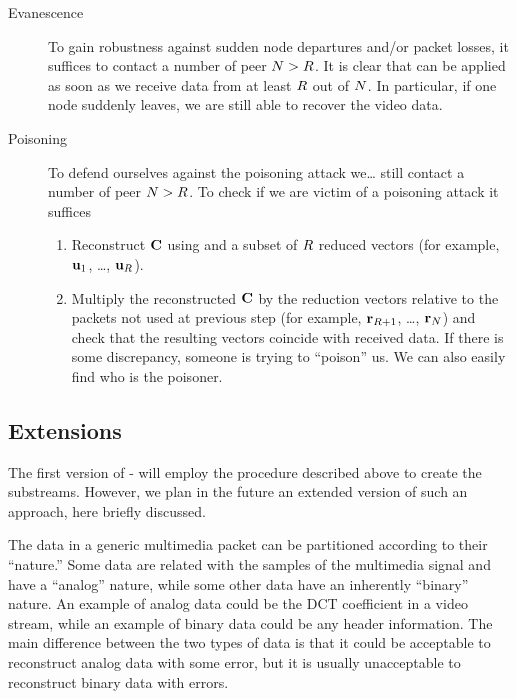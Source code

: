\documentclass{medusabook}
\begin{document}
\begin{description}
\item[Evanescence]
To gain robustness against sudden node departures and/or packet
losses, it suffices to contact a number of peer $N >
R$. It is clear that  can be applied as
soon as we receive data from at least $R$ out of $N$.  In
particular, if one node suddenly leaves, we are still able to recover
the video data.
\item[Poisoning]
To defend ourselves against the poisoning attack we\ldots{} still
contact a number of peer $N > R$.  To check if we are
victim of a poisoning attack it suffices
\begin{enumerate}
\item
Reconstruct ${\mathbf C}$ using  and a subset of
$R$ reduced vectors (for example, ${\mathbf u}_1$, \ldots, ${\mathbf u}_R$).
\item
Multiply the reconstructed ${\mathbf C}$ by the reduction vectors relative to
the packets not used at previous step (for example,
${\mathbf r}_{R+1}$, \ldots, ${\mathbf r}_N$) and check that the
resulting vectors coincide with received data.  If there is some
discrepancy, someone is trying to ``poison'' us. We can also easily
find who is the poisoner.
\end{enumerate}
%
\end{description}

\subsection{Extensions}
\label{sub:1.0.1;medusa_book}

The first version of \medusa- will employ the procedure described
above to create the substreams.  However, we plan in the future an
extended version of such an approach, here briefly discussed.

The data in a generic multimedia packet can be partitioned according
to their ``nature.'' Some data are related with the samples of the
multimedia signal and have a ``analog'' nature, while some other data
have an inherently ``binary'' nature.  An example of analog data could
be the DCT coefficient in a video stream, while an example of binary
data could be any header information.  The main difference between the
two types of data is that it could be acceptable to reconstruct analog
data with some error, but it is usually unacceptable to reconstruct
binary data with errors.  
\end{document}

